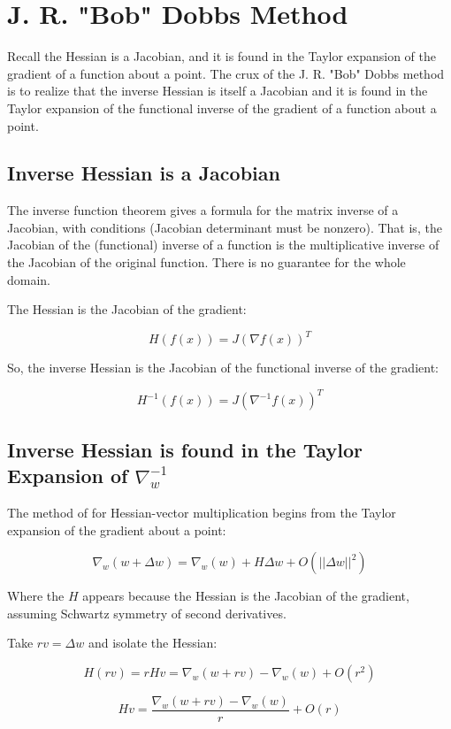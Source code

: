 \documentclass{article}
\begin{document}
\section{J. R. "Bob" Dobbs Method}

Recall the Hessian is a Jacobian, and it is found in the Taylor expansion of the gradient of a function about a point. The crux of the J. R. "Bob" Dobbs method is to realize that the inverse Hessian is itself a Jacobian and it is found in the Taylor expansion of the functional inverse of the gradient of a function about a point.

\subsection{Inverse Hessian is a Jacobian}

The inverse function theorem \cite{lang1995} gives a formula for the matrix inverse of a Jacobian, with conditions (Jacobian determinant must be nonzero). That is, the Jacobian of the (functional) inverse of a function is the multiplicative inverse of the Jacobian of the original function. There is no guarantee for the whole domain.

The Hessian is the Jacobian of the gradient:

$$H(f(x)) = J(\nabla f(x))^T $$

So, the inverse Hessian is the Jacobian of the functional inverse of the gradient:

$$H^{-1}(f(x)) = J(\nabla^{-1} f(x))^T $$

\subsection{Inverse Hessian is found in the Taylor Expansion of $\nabla_w^{-1}$}

The method of \cite{pearlmutter1994} for Hessian-vector multiplication begins from the Taylor expansion of the gradient about a point:

$$\nabla_w (w + \Delta w) = \nabla_w (w) + H\Delta w + O(||\Delta w||^2)$$

Where the $H$ appears because the Hessian is the Jacobian of the gradient, assuming Schwartz symmetry of second derivatives.

Take $rv = \Delta w$ and isolate the Hessian:

$$H(rv) = rHv = \nabla_w(w + rv) - \nabla_w(w) + O(r^2)$$

$$Hv = \frac{\nabla_w(w + rv) - \nabla_w(w)}{r} + O(r)$$
\end{document}
